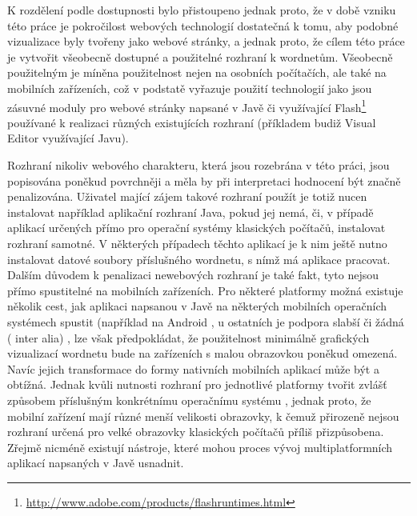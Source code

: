 \documentclass[a4paper, 11pt, oneside]{book}
\begin{document}
				K rozdělení podle dostupnosti bylo přistoupeno jednak proto, že v době vzniku této práce je pokročilost webových technologií dostatečná k tomu, aby podobné vizualizace byly tvořeny jako webové stránky, a jednak proto, že cílem této práce je vytvořit všeobecně dostupné a použitelné rozhraní k wordnetům. Všeobecně použitelným je míněna použitelnost nejen na osobních počítačích, ale také na mobilních zařízeních, což v podstatě vyřazuje použití technologií jako jsou zásuvné moduly pro webové stránky napsané v Javě či využívající Flash\footnote{\url{http://www.adobe.com/products/flashruntimes.html}} používané k realizaci různých existujících rozhraní (příkladem budiž Visual Editor využívající Javu). 

				Rozhraní nikoliv webového charakteru, která jsou rozebrána v této práci, jsou popisována poněkud povrchněji a měla by při interpretaci hodnocení být značně penalizována. Uživatel mající zájem takové rozhraní použít je totiž nucen instalovat například aplikační rozhraní Java, pokud jej nemá, či, v případě aplikací určených přímo pro operační systémy klasických počítačů, instalovat rozhraní samotné. V některých případech těchto aplikací je k nim ještě nutno instalovat datové soubory příslušného wordnetu, s nímž má aplikace pracovat. Dalším důvodem k penalizaci newebových rozhraní je také fakt, tyto nejsou přímo spustitelné na mobilních zařízeních. Pro některé platformy možná existuje několik cest, jak aplikaci napsanou v Javě na některých mobilních operačních systémech spustit (například na Android \parencite{SX92854}, u ostatních je podpora slabší či žádná (\parencite{SX15501535,SX1193541} inter alia)%
				, lze však předpokládat, že použitelnost minimálně grafických vizualizací wordnetu bude na zařízeních s malou obrazovkou poněkud omezená.  Navíc jejich transformace do formy nativních mobilních aplikací může být a obtížná. Jednak kvůli nutnosti rozhraní pro jednotlivé platformy tvořit zvlášť způsobem příslušným konkrétnímu operačnímu systému \parencite{gronli2014mobile}, jednak proto, že mobilní zařízení mají různé menší velikosti obrazovky, k čemuž přirozeně nejsou rozhraní určená pro velké obrazovky klasických počítačů příliš přizpůsobena. Zřejmě nicméně existují nástroje, které mohou proces vývoj multiplatformních aplikací napsaných v Javě usnadnit. \parencite{mafintro}
\end{document}
